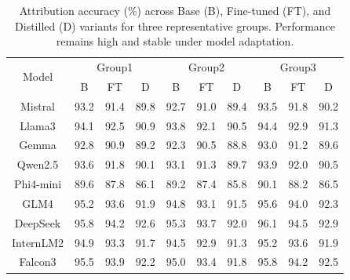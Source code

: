 \begin{table}
\vspace{-1.0em}
\centering
\scriptsize
\setlength{\tabcolsep}{4.5pt}
\renewcommand{\arraystretch}{1.3}
\begin{tabular}{c|ccc|ccc|ccc}
\hline
\multirow{2}{*}{Model} 
& \multicolumn{3}{c|}{Group1}
& \multicolumn{3}{c|}{Group2}
& \multicolumn{3}{c}{Group3} \\

& B & FT & D
& B & FT & D
& B & FT & D \\
\hline

Mistral 
& 93.2 & 91.4 & 89.8 
& 92.7 & 91.0 & 89.4 
& 93.5 & 91.8 & 90.2 \\

Llama3
& 94.1 & 92.5 & 90.9 
& 93.8 & 92.1 & 90.5 
& 94.4 & 92.9 & 91.3 \\

Gemma 
& 92.8 & 90.9 & 89.2 
& 92.3 & 90.5 & 88.8 
& 93.0 & 91.2 & 89.6 \\

Qwen2.5
& 93.6 & 91.8 & 90.1 
& 93.1 & 91.3 & 89.7 
& 93.9 & 92.0 & 90.5 \\

Phi4-mini
& 89.6 & 87.8 & 86.1 
& 89.2 & 87.4 & 85.8 
& 90.1 & 88.2 & 86.5 \\

GLM4
& 95.2 & 93.6 & 91.9
& 94.8 & 93.1 & 91.5
& 95.6 & 94.0 & 92.3 \\

DeepSeek
& 95.8 & 94.2 & 92.6
& 95.3 & 93.7 & 92.0
& 96.1 & 94.5 & 92.9 \\

InternLM2
& 94.9 & 93.3 & 91.7
& 94.5 & 92.9 & 91.3
& 95.2 & 93.6 & 91.9 \\

Falcon3
& 95.5 & 93.9 & 92.2
& 95.0 & 93.4 & 91.8
& 95.8 & 94.2 & 92.5 \\

\hline
\end{tabular}
\caption{Attribution accuracy (\%) across Base (B), Fine-tuned (FT), and Distilled (D) variants for three representative groups. Performance remains high and stable under model adaptation.}
\label{tab:model_wise_attribution}
\vspace{-1.25em}
\end{table}


